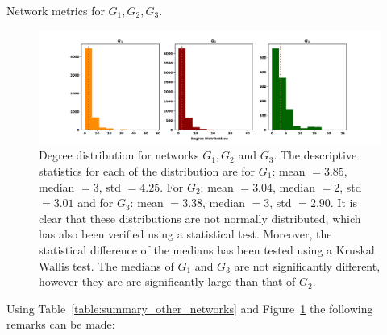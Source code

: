\documentclass{article}
\theoremstyle{definition}
\begin{document}
\begin{table}[!hbtp]
    \centering
    \resizebox{\textwidth}{!}{
    }
    \caption{Network metrics for \(G_1, G_2, G_3\).}\label{table:summary_other_networks}
\end{table}

\begin{figure}[!hbtp]
    \centering
    \includegraphics[width=\textwidth]{./assets/images/networks_ditributions.pdf}
    \caption{Degree distribution for networks \(G_1, G_2\) and \(G_3\). The descriptive
    statistics for each of the distribution are for \(G_1\): mean \(=3.85\),
    median \(=3\), std \(=4.25\). For \(G_2\): mean \(=3.04\), median \(=2\),
    std \(=3.01\) and for \(G_3\): mean \(=3.38\), median \(=3\), std \(=2.90\).
    It is clear that these distributions are not normally distributed, which has
    also been verified using a statistical test. Moreover, the statistical difference
    of the medians has been tested using a Kruskal Wallis test. The medians
    of \(G_1\) and \(G_3\) are not significantly different, however they are
    are significantly large than that of \(G_2\).}\label{fig:degree_distrs}
\end{figure}

Using Table~\ref{table:summary_other_networks} and Figure~\ref{fig:degree_distrs}
the following remarks can be made:
\end{document}
